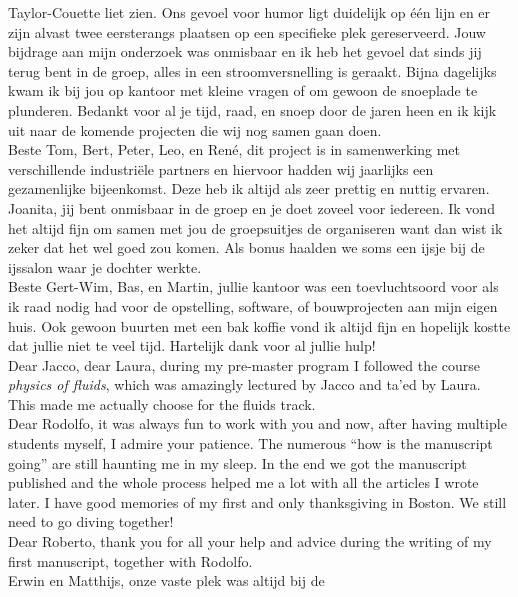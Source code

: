 Taylor-Couette liet zien. Ons gevoel voor humor ligt duidelijk op \'e\'en lijn
en er zijn alvast twee eersterangs plaatsen op een specifieke plek gereserveerd.
Jouw bijdrage aan mijn onderzoek was onmisbaar en ik heb het gevoel dat sinds
jij terug bent in de groep, alles in een stroomversnelling is geraakt.
Bijna dagelijks kwam ik bij jou op kantoor met kleine vragen of om gewoon de
snoeplade te plunderen. Bedankt voor al je tijd, raad, en snoep door de jaren
heen en ik kijk uit naar de komende projecten die wij nog samen gaan doen.\\
\indent Beste Tom, Bert, Peter, Leo, en Ren\'e, dit
project is in samenwerking met verschillende industri\"ele partners en
hiervoor hadden wij jaarlijks een gezamenlijke bijeenkomst. Deze heb ik altijd
als zeer prettig en nuttig ervaren.\\
\indent Joanita, jij bent onmisbaar in de groep en je doet zoveel voor
iedereen. Ik vond het altijd fijn om samen met jou de groepsuitjes de
organiseren want dan wist ik zeker dat het wel goed zou komen. Als bonus
haalden we soms een ijsje bij de ijssalon waar je dochter werkte.\\
\indent Beste Gert-Wim, Bas, en Martin, jullie kantoor was een toevluchtsoord
voor als ik raad nodig had voor de opstelling, software, of bouwprojecten aan mijn
eigen huis. Ook gewoon buurten met een bak koffie vond ik altijd fijn en
hopelijk kostte dat jullie niet te veel tijd. Hartelijk dank voor al jullie hulp!\\
\mfl{\flagusa}\indent Dear Jacco, dear Laura, during my pre-master program I
followed the course \emph{physics of fluids}, which was amazingly lectured by
Jacco and ta'ed by Laura. This made me actually choose for the fluids track.\\
\indent Dear Rodolfo, it was always fun to work with you and now,
after having multiple students myself, I admire your patience. The numerous
``how is the manuscript going'' are still haunting me in my sleep. In the end
we got the manuscript published and the whole process helped me a lot with all
the articles I wrote later. I have good memories of my first and only
thanksgiving in Boston. We still need to go diving together!\\
\indent Dear Roberto, thank you for all your help and advice during the
writing of my first manuscript, together with Rodolfo.\\
\mfl{\flagnld}\indent Erwin en Matthijs, onze vaste plek was altijd bij de

